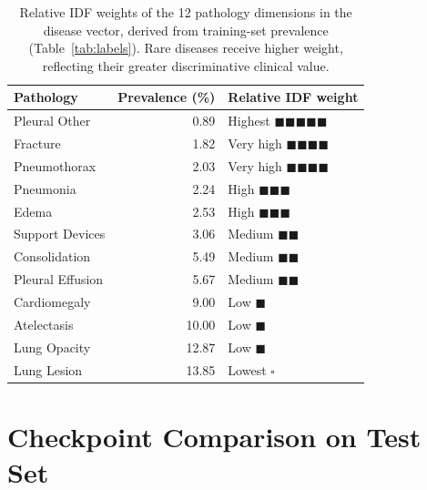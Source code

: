 \documentclass[11pt, a4paper]{article}
\begin{document}
\begin{table}[H]
  \centering
  \caption{Relative IDF weights of the 12 pathology dimensions in the
    disease vector, derived from training-set prevalence
    (Table~\ref{tab:labels}).
    Rare diseases receive higher weight, reflecting their greater
    discriminative clinical value.}
  \label{tab:idfweights}
  \small\renewcommand{\arraystretch}{1.05}
  \begin{tabular}{lrl}
    \toprule
    \textbf{Pathology} & \textbf{Prevalence (\%)} & \textbf{Relative IDF weight} \\
    \midrule
    Pleural Other          & 0.89  & Highest  $\blacksquare\blacksquare\blacksquare\blacksquare\blacksquare$ \\
    Fracture               & 1.82  & Very high $\blacksquare\blacksquare\blacksquare\blacksquare$ \\
    Pneumothorax           & 2.03  & Very high $\blacksquare\blacksquare\blacksquare\blacksquare$ \\
    Pneumonia              & 2.24  & High $\blacksquare\blacksquare\blacksquare$ \\
    Edema                  & 2.53  & High $\blacksquare\blacksquare\blacksquare$ \\
    Support Devices        & 3.06  & Medium $\blacksquare\blacksquare$ \\
    Consolidation          & 5.49  & Medium $\blacksquare\blacksquare$ \\
    Pleural Effusion       & 5.67  & Medium $\blacksquare\blacksquare$ \\
    Cardiomegaly           & 9.00  & Low $\blacksquare$ \\
    Atelectasis            & 10.00 & Low $\blacksquare$ \\
    Lung Opacity           & 12.87 & Low $\blacksquare$ \\
    Lung Lesion            & 13.85 & Lowest $\square$ \\
    \bottomrule
  \end{tabular}
\end{table}

\section{Checkpoint Comparison on Test Set}
\label{app:ckpts}
\end{document}
